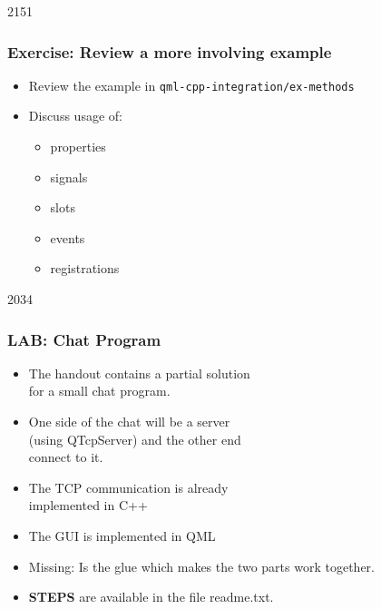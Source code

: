 \begin{slide}{2151}\frametitle{Exercise: Review a more involving example}
  \begin{itemize}
  \item Review the example in \texttt{qml-cpp-integration/ex-methods}
  \item Discuss usage of:
    \begin{itemize}
    \item properties
    \item signals
    \item slots
    \item events
    \item registrations
    \end{itemize}
  \end{itemize}
\end{slide}





\begin{slide}{2034}\frametitle{LAB: Chat Program}
  \begin{itemize}
  \item The handout contains a partial solution\\
    for a small chat program.
  \item One side of the chat will be a server\\
    (using QTcpServer) and the other end\\
    connect to it.
  \item The TCP communication is already\\
    implemented in C++
  \item The GUI is implemented in QML
  \item Missing: Is the glue which makes the two parts work together.
  \item \textbf{STEPS} are available in the file readme.txt.
  \end{itemize}
\end{slide}
